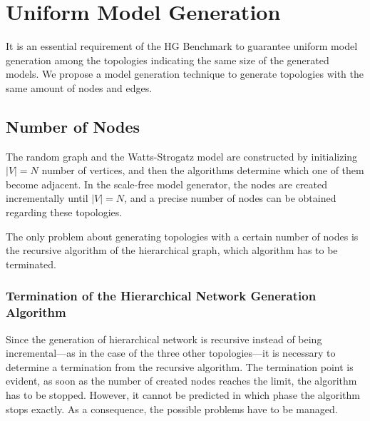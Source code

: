 \section{Uniform Model Generation}\label{sec:uniform_generation}

It is an essential requirement of the HG Benchmark to guarantee uniform model generation among the topologies indicating the same size of the generated models. We propose a model generation technique to generate topologies with the same amount of nodes and edges.

\subsection{Number of Nodes}

The random graph and the Watts-Strogatz model are constructed by initializing $|V| = N$ number of vertices, and then the algorithms determine which one of them become adjacent. In the scale-free model generator, the nodes are created incrementally until $|V| = N$, and a precise number of nodes can be obtained regarding these topologies.

The only problem about generating topologies with a certain number of nodes is the recursive algorithm of the hierarchical graph, which algorithm has to be terminated.

\subsubsection{Termination of the Hierarchical Network Generation Algorithm}\label{sec:hierarcical_contribution}

Since the generation of hierarchical network is recursive instead of being incremental---as in the case of the three other topologies---it is necessary to determine a termination from the recursive algorithm. The termination point is evident, as soon as the number of created nodes reaches the limit, the algorithm has to be stopped. However, it cannot be predicted in which phase the algorithm stops exactly. As a consequence, the possible problems have to be managed.

